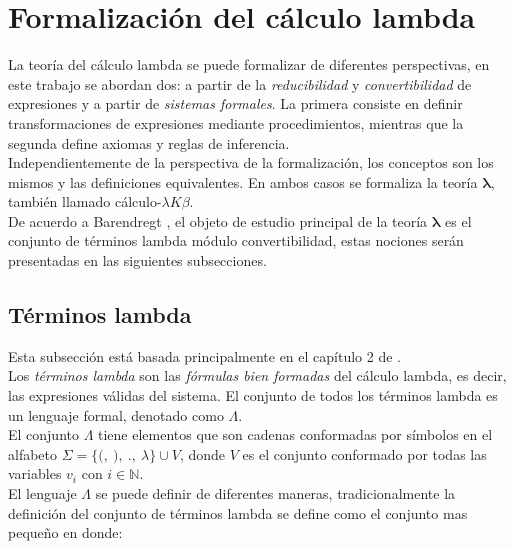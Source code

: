 \section{Formalización del cálculo lambda}

La teoría del cálculo lambda se puede formalizar de diferentes perspectivas, en
este trabajo se abordan dos: a partir de la \emph{reducibilidad} y
\emph{convertibilidad} de expresiones y a partir de \emph{sistemas formales}. La
primera consiste en definir transformaciones de expresiones mediante
procedimientos, mientras que la segunda define axiomas y reglas de inferencia.
\\

Independientemente de la perspectiva de la formalización, los conceptos son los
mismos y las definiciones equivalentes. En ambos casos se formaliza la teoría
\(\boldsymbol{\lambda}\), también llamado cálculo-\(\lambda K \beta\). \\

De acuerdo a Barendregt \cite{Barendregt:Bible}, el objeto de estudio principal
de la teoría \(\boldsymbol{\lambda}\) es el conjunto de términos lambda módulo
convertibilidad, estas nociones serán presentadas en las siguientes
subsecciones. \\

\subsection{Términos lambda}

Esta subsección está basada principalmente en el capítulo 2 de
\cite{Barendregt:Bible}. \\

Los \emph{términos lambda} son las \emph{fórmulas bien formadas} del cálculo
lambda, es decir, las expresiones válidas del sistema. El conjunto de todos los
términos lambda es un lenguaje formal, denotado como \(\Lambda\). \\

El conjunto \(\Lambda\) tiene elementos que son cadenas conformadas por símbolos
en el alfabeto \(\Sigma = \{\texttt{(},\ \texttt{)},\ \texttt{.},\ \lambda\}
\cup V\), donde \(V\) es el conjunto conformado por todas las variables
\(v_{i}\) con \(i\in \mathbb{N}\). \\

El lenguaje \(\Lambda\) se puede definir de diferentes maneras,
tradicionalmente la definición del conjunto de términos lambda se define como el
conjunto mas pequeño en donde: \\


